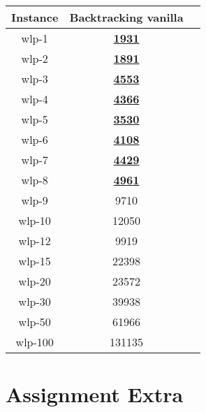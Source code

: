 \documentclass{article}
\newcommand{\sol}[1]{#1}
\newcommand{\proved}[1]{\textbf{\underline{#1}}}
\begin{document}
\begin{table}[H]
    \begin{center}
        \begin{tabular}{|c|c|c|}
            \hline
            \textbf{Instance}&\textbf{Backtracking vanilla}  \\
            \hline
            wlp-1         &   \proved{1931} \\
            \hline
            wlp-2         &   \proved{1891} \\
            \hline
            wlp-3         &   \proved{4553} \\
            \hline
            wlp-4         &   \proved{4366} \\
            \hline
            wlp-5         &   \proved{3530} \\
            \hline
            wlp-6         &   \proved{4108} \\
            \hline
            wlp-7         &   \proved{4429} \\
            \hline
            wlp-8         &   \proved{4961} \\
            \hline
            wlp-9         &   \sol{9710}    \\
            \hline
            wlp-10        &   \sol{12050}   \\
            \hline
            wlp-12        &   \sol{9919}    \\
            \hline
            wlp-15        &   \sol{22398}   \\
            \hline
            wlp-20        &   \sol{23572}   \\
            \hline
            wlp-30        &   \sol{39938}   \\
            \hline
            wlp-50        &   \sol{61966}   \\
            \hline
            wlp-100       &   \sol{131135}  \\
            \hline
        \end{tabular}
    \end{center}
\end{table}

\section{Assignment Extra}
\end{document}
